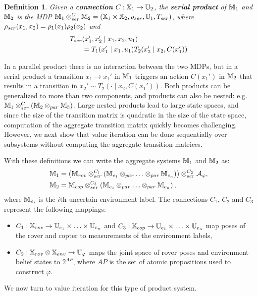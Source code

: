 \documentclass[draft,conference]{IEEEtran}
\newtheorem{definition}{Definition}
\begin{document}
\begin{definition}
  Given a \textbf{connection} $C : \mathbb{X}_1 \rightarrow \mathbb{U}_2$, the \textbf{serial product} of $\mathbb{M}_1$ and $\mathbb{M}_2$ is the MDP $\mathbb{M}_1 \otimes_{ser}^C \mathbb{M}_2 = (\mathbb{X}_1 \times \mathbb{X}_2, \rho_{ser}, \mathbb{U}_1, T_{ser})$,
  where $\rho_{ser}(x_1, x_2) = \rho_1(x_1) \rho_2(x_2)$
  and
  \begin{equation}\label{eq:serial}
  \begin{aligned}
      \tr_{ser}&(x_1', x_2' \mid x_1, x_2, u_1) \\
      & = \tr_1 (x_1' \mid x_1, u_1) \tr_2 (x_2' \mid x_2, C(x_1') )
  \end{aligned}
  \end{equation}
\end{definition}
In a parallel product there is no interaction between the two MDPs, but in a serial product a transition $x_1 \rightarrow x_1'$ in $\mathbb{M}_1$ triggers an action $C(x_1')$ in $\mathbb{M}_2$ that results in a transition in $x_2' \sim T_2(\cdot \mid x_2, C(x_1'))$. Both products can be generalized to more than two components, and products can also be nested: e.g. $\mathbb{M}_1 \otimes_{ser}^C \left( \mathbb{M}_2 \otimes_{par} \mathbb{M}_3 \right)$. Large nested products lead to large state spaces, and since the size of the transition matrix is quadratic in the size of the state space, computation of the aggregate transition matrix quickly becomes challenging. However, we next show that value iteration can be done sequentially over subsystems without computing the aggregate transition matrices.

With these definitions we can write the aggregate systems $\mathbb{M}_1$ and $\mathbb{M}_2$ as:
\begin{equation}
\label{eq:syst_prod_def}
\begin{aligned}
	\MDP_1 & = \left( \MDP_{rov} \otimes_{ser}^{C_1} \left( \MDP_{e_1} \otimes_{par} \ldots \otimes_{par} \MDP_{e_n} \right) \right) \otimes_{ser}^{C_2} \mathcal A_{\varphi}, \\
	\MDP_2 & = \MDP_{cop} \otimes_{ser}^{C_3} \left( \MDP_{e_1} \otimes_{par} \ldots \otimes_{par} \MDP_{e_n} \right),
\end{aligned}
\end{equation}
where $\mathbb{M}_{e_i}$ is the $i$th uncertain environment label. The connections $C_1$, $C_2$ and $C_3$ represent the following mappings:
\begin{itemize}
	\item $C_1 : \mathbb{X}_{rov} \rightarrow \mathbb{U}_{e_1} \times \ldots \times \mathbb{U}_{e_n}$ and $C_3 : \mathbb{X}_{cop} \rightarrow \mathbb{U}_{e_1} \times \ldots \times \mathbb{U}_{e_n}$ map poses of the rover and copter to measurements of the environment labels,
	\item $C_2 : \mathbb{X}_{rov} \otimes \mathbb{X}_{env} \rightarrow \mathbb{U}_{\varphi}$ maps the joint space of rover poses and environment belief states to $2^{AP}$, where $AP$ is the set of atomic propositions used to construct $\varphi$.
\end{itemize}
We now turn to value iteration for this type of product system.
\end{document}
